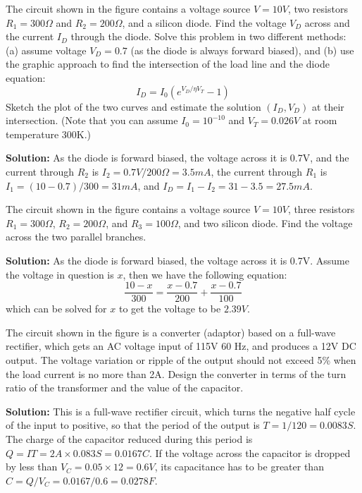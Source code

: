
\item The circuit shown in the figure contains a voltage source $V=10V$,
two resistors $R_1=300\Omega$ and $R_2=200\Omega$, and a silicon diode.
Find the voltage $V_D$ across and the current $I_D$ through the diode.
Solve this problem in two different methods: (a) assume voltage $V_D=0.7$ 
(as the diode is always forward biased), and (b) use the graphic approach
to find the intersection of the load line and the diode equation:
\[ I_D=I_0 ( e^{V_D/\eta V_T}-1 ) \]
Sketch the plot of the two curves and estimate the solution $(I_D,V_D)$
at their intersection. (Note that you can assume $I_0=10^{-10}$ and 
$V_T=0.026V$ at room temperature 300K.)


{\bf Solution:} As the diode is forward biased, the voltage across it
is 0.7V, and the current through $R_2$ is $I_2=0.7V/200\Omega=3.5mA$, 
the current through $R_1$ is $I_1=(10-0.7)/300=31 mA$, and 
$I_D=I_1-I_2=31-3.5=27.5 mA$.


\item The circuit shown in the figure contains a voltage source $V=10V$,
three resistors $R_1=300\Omega$, $R_2=200\Omega$, and $R_3=100\Omega$, 
and two silicon diode. Find the voltage across the two parallel branches.


{\bf Solution:} As the diode is forward biased, the voltage across it
is 0.7V. Assume the voltage in question is $x$, then we have the following
equation:
\[	\frac{10-x}{300}=\frac{x-0.7}{200}+\frac{x-0.7}{100}	\]
which can be solved for $x$ to get the voltage to be $2.39V$.

\item The circuit shown in the figure is a converter (adaptor) based on
a full-wave rectifier, which gets an AC voltage input of 115V 60 Hz, and
produces a 12V DC output. The voltage variation or ripple of the output
should not exceed 5\% when the load current is no more than 2A. Design 
the converter in terms of the turn ratio of the transformer and the 
value of the capacitor. 


{\bf Solution:} This is a full-wave rectifier circuit, which turns the
negative half cycle of the input to positive, so that the period of the
output is $T=1/120=0.0083S$. The charge of the capacitor reduced during
this period is $Q=IT=2A\times 0.083 S=0.0167 C$. If the voltage across
the capacitor is dropped by less than $V_C=0.05\times 12=0.6V$, its 
capacitance has to be greater than $C=Q/V_C=0.0167/0.6=0.0278 F$.

